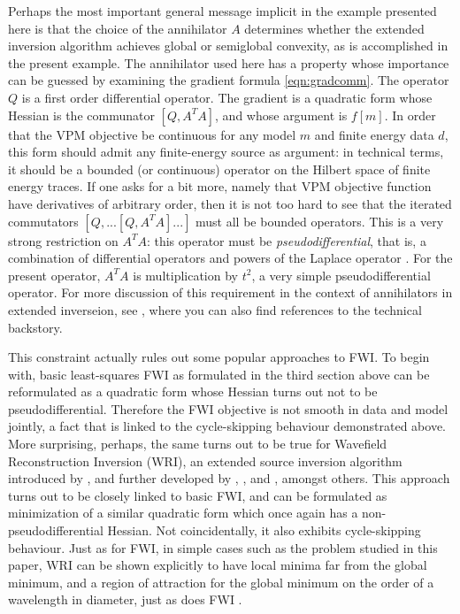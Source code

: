 Perhaps the most important general message implicit in the example
presented here is that the choice of the annihilator $A$ determines
whether the extended inversion algorithm achieves global or semiglobal
convexity, as is accomplished in the present example. The annihilator
used here has a property whose importance can be guessed by
examining the gradient formula \ref{eqn:gradcomm}. The operator $Q$ is
a first order differential operator. The gradient is a quadratic form
whose Hessian is the communator $[Q,A^TA]$, and whose argument is
$f[m]$. In order that the VPM objective be continuous for any model
$m$ and finite energy data $d$, this form should admit any
finite-energy source as argument: in technical terms, it should be a
bounded (or continuous) operator on the Hilbert space of finite energy
traces. If one asks for a bit more, namely that VPM objective function
have derivatives of arbitrary order, then it is not too hard to see
that the iterated commutators $[Q,...[Q,A^TA]...]$ must all be bounded
operators. This is a very strong restriction on $A^TA$: this operator
must be {\em pseudodifferential}, that is, a combination of
differential operators and powers of the Laplace operator
\cite[]{Tay:81}. For the present operator, $A^TA$ is
multiplication by $t^2$, a very simple pseudodifferential
operator. For more discussion of this requirement in the context of
annihilators in extended inverseion, see \cite{geoprosp:2008}, where
you can also find references to the technical backstory.

This constraint actually rules out some popular approaches to FWI. To
begin with, basic least-squares FWI as formulated in the third section
above can be reformulated as a quadratic form whose Hessian turns out
not to be pseudodifferential. Therefore the FWI objective is not
smooth in data and model jointly, a fact that is linked to the
cycle-skipping behaviour demonstrated above. More surprising, perhaps,
the same turns out to be true for Wavefield Reconstruction Inversion (WRI),
an extended source inversion algorithm introduced by
\cite{LeeuwenHerrmannWRI:13}, and further developed by
\cite{LeeuwenHerrmann:16}, \cite{WangYingst:SEG16}, and
\cite{Aghamiry:19}, amongst others. This approach turns out to be closely
linked to basic FWI, and can be formulated as minimization of a similar quadratic form
which once again has a non-pseudodifferential Hessian. Not
coincidentally, it also exhibits cycle-skipping behaviour. Just as for
FWI, in simple cases such as the problem studied in this paper, WRI
can be shown explicitly to have local minima far from the global
minimum, and a region of attraction for the global minimum on the
order of a wavelength in diameter, just as does FWI \cite[]{wwsorcas:20-01}.

